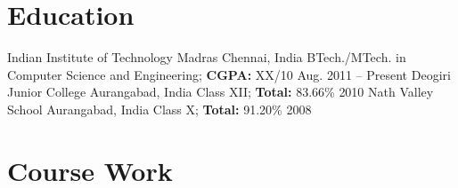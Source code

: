 \documentclass[letterpaper,11pt]{resume}
\author{Siddhant Sunilkumar Mutha}
\begin{document}
\resumeheader
\section{Education}
\begin{itemize}
    \credential
    {{Indian Institute of Technology Madras}}
    {Chennai, India}
    {{BTech./MTech. in Computer Science
      and Engineering}; {{\bf CGPA:} XX/10}
      }
    {Aug. 2011 -- Present}
    \bigskip
   \credential
    {{Deogiri Junior College}}
    {Aurangabad, India}
    {{Class XII}; {{\bf Total:} 83.66\%}
     }
    {2010}
   \bigskip
   \credential
    {{Nath Valley School}}
    {Aurangabad, India}
    {{Class X}; {{\bf Total:} 91.20\%}}
    {2008}
   \bigskip 

\end{itemize}
\section{Course Work}
\end{document}

